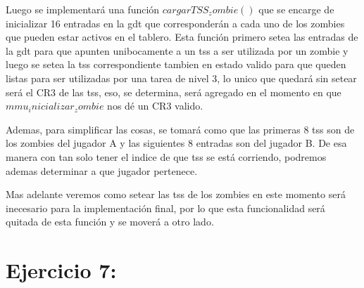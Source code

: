\documentclass[a4paper]{article}
\begin{document}
Luego se implementará una función $cargarTSS_zombie()$ que se encarge de inicializar 16 entradas en la gdt que corresponderán a cada uno de los zombies que pueden estar activos en el tablero. Esta función primero setea las entradas de la gdt para que apunten unibocamente a un tss a ser utilizada por un zombie y luego se setea la tss correspondiente tambien en estado valido para que queden listas para ser utilizadas por una tarea de nivel 3, lo unico que quedará sin setear será el CR3 de las tss, eso, se determina, será agregado en el momento en que $mmu_inicializar_zombie$ nos dé un CR3 valido.

Ademas, para simplificar las cosas, se tomará como que las primeras 8 tss son de los zombies del jugador A y las siguientes 8 entradas son del jugador B. De esa manera con tan solo tener el indice de que tss se está corriendo, podremos ademas determinar a que jugador pertenece.

Mas adelante veremos como setear las tss de los zombies en este momento será inecesario para la implementación final, por lo que esta funcionalidad será quitada de esta función y se moverá a otro lado.

\clearpage

\section{Ejercicio 7:}
\end{document}
